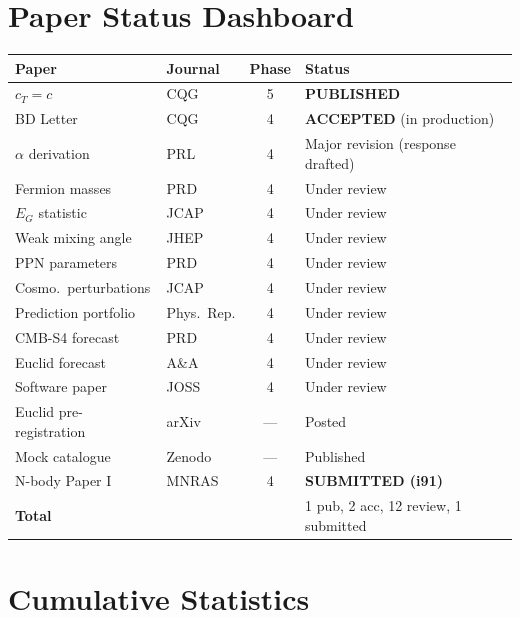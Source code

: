 \documentclass[11pt,a4paper]{article}
\begin{document}
\section{Paper Status Dashboard}

\begin{center}
\begin{longtable}{p{4.5cm}lcl}
\toprule
\textbf{Paper} & \textbf{Journal} & \textbf{Phase} & \textbf{Status} \\
\midrule
\endhead
$c_T = c$ & CQG & 5 & \textbf{PUBLISHED} \\
BD Letter & CQG & 4 & \textbf{ACCEPTED} (in production) \\
$\alpha$ derivation & PRL & 4 & Major revision (response drafted) \\
Fermion masses & PRD & 4 & Under review \\
$E_G$ statistic & JCAP & 4 & Under review \\
Weak mixing angle & JHEP & 4 & Under review \\
PPN parameters & PRD & 4 & Under review \\
Cosmo.\ perturbations & JCAP & 4 & Under review \\
Prediction portfolio & Phys.\ Rep. & 4 & Under review \\
CMB-S4 forecast & PRD & 4 & Under review \\
Euclid forecast & A\&A & 4 & Under review \\
Software paper & JOSS & 4 & Under review \\
Euclid pre-registration & arXiv & --- & Posted \\
Mock catalogue & Zenodo & --- & Published \\
N-body Paper I & MNRAS & 4 & \textbf{SUBMITTED (i91)} \\
\midrule
\textbf{Total} & & & 1 pub, 2 acc, 12 review, 1 submitted \\
\bottomrule
\end{longtable}
\end{center}

\section{Cumulative Statistics}
\end{document}
